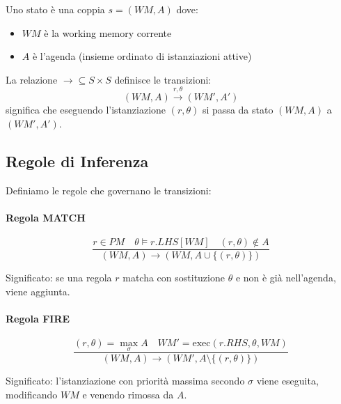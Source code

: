 \begin{definizione}
Uno stato è una coppia $s = (WM, A)$ dove:
\begin{itemize}
\item $WM$ è la working memory corrente
\item $A$ è l'agenda (insieme ordinato di istanziazioni attive)
\end{itemize}
\end{definizione}

\begin{definizione}
La relazione $\to \subseteq S \times S$ definisce le transizioni:
\begin{equation}
(WM, A) \xrightarrow{r, \theta} (WM', A')
\end{equation}
significa che eseguendo l'istanziazione $(r, \theta)$ si passa da stato $(WM, A)$ a $(WM', A')$.
\end{definizione}

\subsection{Regole di Inferenza}

Definiamo le regole che governano le transizioni:

\paragraph{Regola MATCH}

\begin{equation}
\frac{
  r \in PM \quad \theta \vDash r.LHS[WM] \quad (r, \theta) \notin A
}{
  (WM, A) \to (WM, A \cup \{(r, \theta)\})
}
\end{equation}

Significato: se una regola $r$ matcha con sostituzione $\theta$ e non è già nell'agenda, viene aggiunta.

\paragraph{Regola FIRE}

\begin{equation}
\frac{
  (r, \theta) = \max_\sigma A \quad WM' = \text{exec}(r.RHS, \theta, WM)
}{
  (WM, A) \to (WM', A \setminus \{(r, \theta)\})
}
\end{equation}

Significato: l'istanziazione con priorità massima secondo $\sigma$ viene eseguita, modificando $WM$ e venendo rimossa da $A$.

